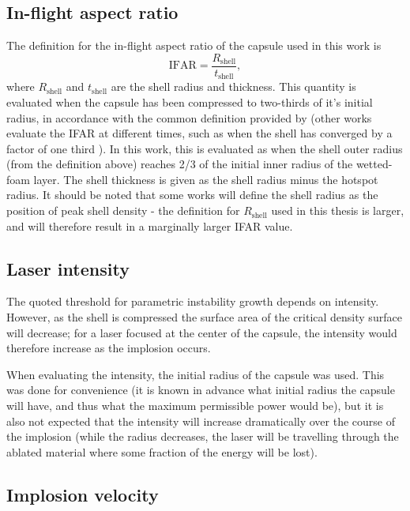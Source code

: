 \subsection{In-flight aspect ratio}

The definition for the in-flight aspect ratio of the capsule used in this work is \begin{equation} \mathrm{IFAR} = \frac{R_\mathrm{shell}}{t_\mathrm{shell}}, \end{equation}
where $R_\mathrm{shell}$ and $t_\mathrm{shell}$ are the shell radius and thickness. This quantity is evaluated when the capsule has been compressed to two-thirds of it's initial radius, in accordance with the common definition provided by \cite{Craxton2015} (other works evaluate the IFAR at different times, such as when the shell has converged by a factor of one third \cite{Radha2011}). In this work, this is evaluated as when the shell outer radius (from the definition above) reaches 2/3 of the initial inner radius of the wetted-foam layer. The shell thickness is given as the shell radius minus the hotspot radius. It should be noted that some works will define the shell radius as the position of peak shell density - the definition for $R_\mathrm{shell}$ used in this thesis is larger, and will therefore result in a marginally larger IFAR value.

\subsection{Laser intensity}

The quoted threshold for parametric instability growth depends on intensity. However, as the shell is compressed the surface area of the critical density surface will decrease; for a laser focused at the center of the capsule, the intensity would therefore increase as the implosion occurs.

When evaluating the intensity, the initial radius of the capsule was used. This was done for convenience (it is known in advance what initial radius the capsule will have, and thus what the maximum permissible power would be), but it is also not expected that the intensity will increase dramatically over the course of the implosion (while the radius decreases, the laser will be travelling through the ablated material where some fraction of the energy will be lost).

\subsection{Implosion velocity}

